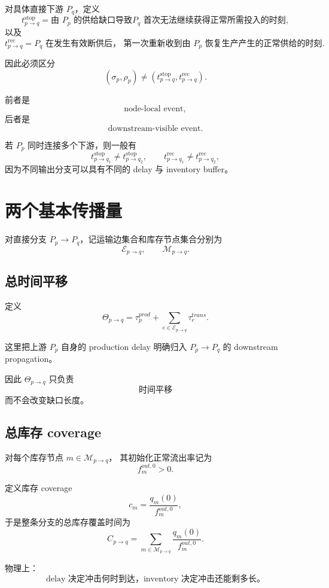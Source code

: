 \documentclass[UTF8,11pt]{ctexart}
\begin{document}
对具体直接下游 \(P_q\)，定义
\[
\boxed{
t_{p\to q}^{\mathrm{stop}}
=
\text{由 \(P_p\) 的供给缺口导致
\(P_q\) 首次无法继续获得正常所需投入的时刻},
}
\]
以及
\[
\boxed{
t_{p\to q}^{\mathrm{rec}}
=
\text{\(P_q\) 在发生有效断供后，
第一次重新收到由 \(P_p\) 恢复生产产生的正常供给的时刻}.
}
\]

因此必须区分
\[
\boxed{
(\sigma_p,\rho_p)
\neq
(t_{p\to q}^{\mathrm{stop}},t_{p\to q}^{\mathrm{rec}}).
}
\]

前者是
\[
\text{node-local event},
\]
后者是
\[
\text{downstream-visible event}.
\]

若 \(P_p\) 同时连接多个下游，则一般有
\[
t_{p\to q_1}^{\mathrm{stop}}
\neq
t_{p\to q_2}^{\mathrm{stop}},
\qquad
t_{p\to q_1}^{\mathrm{rec}}
\neq
t_{p\to q_2}^{\mathrm{rec}},
\]
因为不同输出分支可以具有不同的 delay 与 inventory buffer。

\section{两个基本传播量}

对直接分支 \(P_p\to P_q\)，记运输边集合和库存节点集合分别为
\[
\mathcal E_{p\to q},
\qquad
\mathcal M_{p\to q}.
\]

\subsection{总时间平移}

定义
\[
\boxed{
\Theta_{p\to q}
=
\tau_p^{prod}
+
\sum_{e\in\mathcal E_{p\to q}}
\tau_e^{trans}.
}
\tag{1}
\]

这里把上游 \(P_p\) 自身的 production delay 明确归入
\(P_p\to P_q\) 的 downstream propagation。

因此 \(\Theta_{p\to q}\) 只负责
\[
\boxed{\text{时间平移}}
\]
而不会改变缺口长度。

\subsection{总库存 coverage}

对每个库存节点 \(m\in\mathcal M_{p\to q}\)，
其初始化正常流出率记为
\[
f_m^{out,0}>0.
\]

定义库存 coverage
\[
c_m=\frac{q_m(0)}{f_m^{out,0}},
\]
于是整条分支的总库存覆盖时间为
\[
\boxed{
C_{p\to q}
=
\sum_{m\in\mathcal M_{p\to q}}
\frac{q_m(0)}{f_m^{out,0}}.
}
\tag{2}
\]

物理上：
\[
\boxed{
\text{delay 决定冲击何时到达，inventory 决定冲击还能剩多长。}
}
\]
\end{document}
